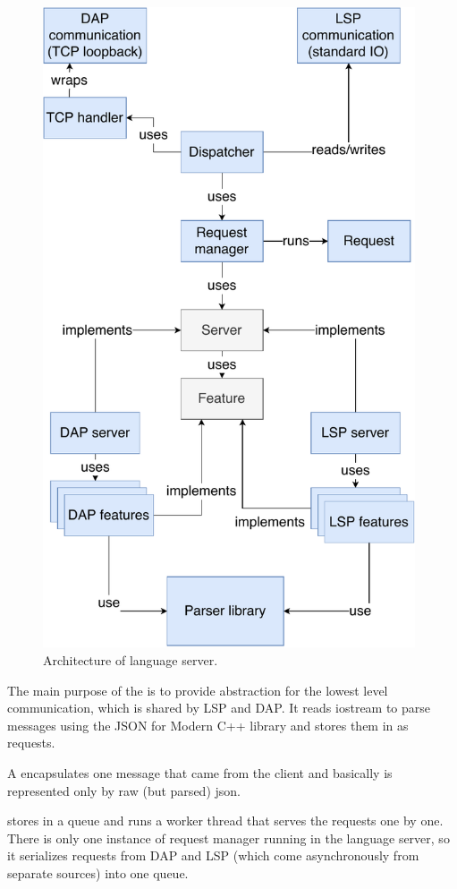 \begin{figure}
	\centering
	\includegraphics[width=11cm]{img/lang_server}
	\caption{Architecture of language server.}
	\label{lang_server_arch}
\end{figure}


The main purpose of the  is to provide abstraction for the lowest level communication, which is shared by LSP and DAP. It reads iostream to parse messages using the JSON for Modern C++ library and stores them in  as requests.

A  encapsulates one message that came from the client and basically is represented only by raw (but parsed) json.

 stores  in a queue and runs a worker thread that serves the requests one by one. There is only one instance of request manager running in the language server, so it serializes requests from DAP and LSP (which come asynchronously from separate sources) into one queue.

